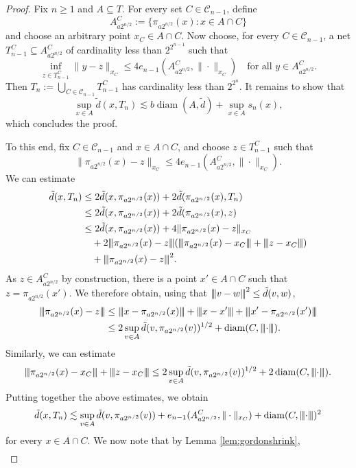 \documentclass[10pt,reqno]{amsart}
\theoremstyle{definition}
\numberwithin{equation}{section}
\numberwithin{figure}{section}
\numberwithin{table}{section}
\newcommand{\diam}{\mathop{\mathrm{diam}}}
\newcommand{\mynegspace}{\hspace{-0.12em}}
\newcommand{\vvv}{\rvert\mynegspace\rvert\mynegspace\rvert}
\newcommand{\nnn}[1]{{\vvv #1 \vvv}}
\begin{document}
\begin{proof}
Fix $n\ge 1$ and $A\subseteq T$. For every set
$C\in\mathcal{C}_{n-1}$, define
$$
	A_{a2^{n/2}}^C := \{\pi_{a2^{n/2}}(x):x\in A\cap C\}
$$
and choose an arbitrary point $x_C\in A\cap C$. Now choose, for every 
$C\in\mathcal{C}_{n-1}$, a net $T_{n-1}^C\subseteq A_{a2^{n/2}}^C$ of 
cardinality less than $2^{2^{n-1}}$ such that
$$
	\inf_{z\in T_{n-1}^C}\|y-z\|_{x_C} \le
	4e_{n-1}(A_{a2^{n/2}}^C,\|\cdot\|_{x_C})
	\quad\mbox{for all }y\in A_{a2^{n/2}}^C.
$$
Then $T_n := \bigcup_{C\in\mathcal{C}_{n-1}}T_{n-1}^C$
has cardinality less than $2^{2^n}$. It remains to show that
$$
	\sup_{x\in A}
	\tilde d(x,T_n) \lesssim b\diam(A,\tilde d)+\sup_{x\in A}s_n(x),
$$
which concludes the proof.

To this end, fix $C\in\mathcal{C}_{n-1}$ and
$x\in A\cap C$, and choose $z\in T_{n-1}^C$ such that
$$
	\|\pi_{a2^{n/2}}(x)-z\|_{x_C} \le
	4e_{n-1}(A_{a2^{n/2}}^C,\|\cdot\|_{x_C}).
$$
We can estimate
\begin{align*}
	\tilde d(x,T_n) &\le 2\tilde d(x,\pi_{a2^{n/2}}(x)) +
	2\tilde d(\pi_{a2^{n/2}}(x),T_n)\\
	&\le 2\tilde d(x,\pi_{a2^{n/2}}(x)) +
	2\tilde d(\pi_{a2^{n/2}}(x),z) \\
	&\le 2\tilde d(x,\pi_{a2^{n/2}}(x)) +
	4\|\pi_{a2^{n/2}}(x)-z\|_{x_C} \\
	&\quad + 
	2\nnn{\pi_{a2^{n/2}}(x)-z}(
	\nnn{\pi_{a2^{n/2}}(x)-x_C}+\nnn{z-x_C}
	) \\
	&\quad + \nnn{\pi_{a2^{n/2}}(x)-z}^2.
\end{align*}
As $z\in A_{a2^{n/2}}^C$ by construction, there is a point $x'\in A\cap C$
such that $z=\pi_{a2^{n/2}}(x')$. We therefore obtain, using that
$\nnn{v-w}^2\le\tilde d(v,w)$,
\begin{align*}
	\nnn{\pi_{a2^{n/2}}(x)-z} &\le
	\nnn{x-\pi_{a2^{n/2}}(x)}+\nnn{x-x'}+
	\nnn{x'-\pi_{a2^{n/2}}(x')}
	\\
	&\le
	2\sup_{v\in A}\tilde d(v,\pi_{a2^{n/2}}(v))^{1/2} +
	\diam(C,\nnn{\cdot}).
\end{align*}
Similarly, we can estimate
$$
	\nnn{\pi_{a2^{n/2}}(x)-x_C}  +
	\nnn{z-x_C}
	\le
	2\sup_{v\in A}\tilde d(v,\pi_{a2^{n/2}}(v))^{1/2} +
	2\diam(C,\nnn{\cdot}).	
$$
Putting together the above estimates, we obtain
$$
	\tilde d(x,T_n) \lesssim
	\sup_{v\in A}\tilde d(v,\pi_{a2^{n/2}}(v)) +
	e_{n-1}(A_{a2^{n/2}}^C,\|\cdot\|_{x_C}) +
	\diam(C,\nnn{\cdot})^2
$$
for every $x\in A\cap C$. We now note that by Lemma 
\ref{lem:gordonshrink},
\begin{align*}

\end{align*}
\end{proof}
\end{document}
